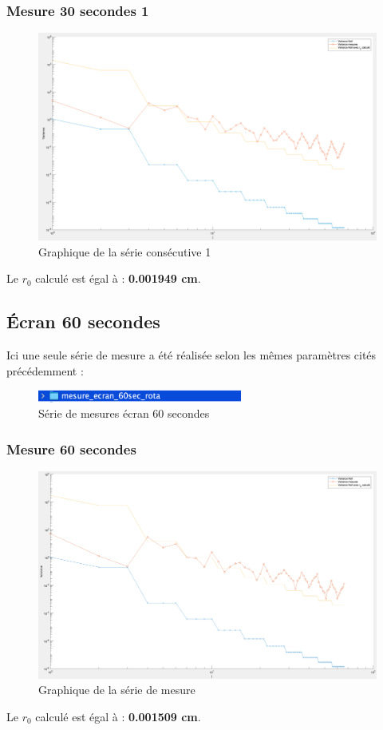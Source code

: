 \subsubsection{Mesure 30 secondes 1}
\begin{figure}[H]
    \centering
    \includegraphics[width = \textwidth]{assets/figures/mesures/mesure_30_sec_1_plot.png}
    \caption{Graphique de la série consécutive 1}
\end{figure}
Le \textbf{$r_0$} calculé est égal à : \textbf{0.001949 cm}.

\subsection{Écran 60 secondes}
Ici une seule série de mesure a été réalisée selon les mêmes paramètres cités précédemment :
\begin{figure}[H]
    \centering
    \includegraphics[width = 0.6\textwidth]{assets/figures/mesures/serie_mesures_60_sec.png}
    \caption{Série de mesures écran 60 secondes}
\end{figure}
\subsubsection{Mesure 60 secondes }
\begin{figure}[H]
    \centering
    \includegraphics[width = \textwidth]{assets/figures/mesures/mesure_60_sec_1_plot.png}
    \caption{Graphique de la série de mesure}
\end{figure}
Le \textbf{$r_0$} calculé est égal à : \textbf{0.001509 cm}.
